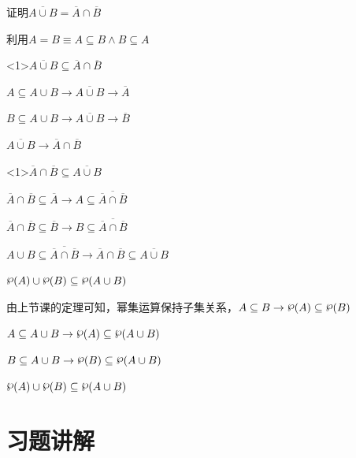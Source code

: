 \documentclass[xetex,10pt,aspectratio=43]{beamer}
\newcommand{\powerset}{\raisebox{.15\baselineskip}{\ensuremath{\wp}}}
\begin{document}
	\begin{frame}{证明$\overline{A\cup B}=\overline{A}\cap\overline{B}$}
	
	利用$A=B\equiv A\subseteq B\wedge B\subseteq A$
	
	\begin{block}{$\overline{A\cup B}\subseteq\overline{A}\cap\overline{B}$}

	$A\subseteq A\cup B\rightarrow\overline{A\cup B}\rightarrow\overline{A}$
	
	$B\subseteq A\cup B\rightarrow\overline{A\cup B}\rightarrow\overline{B}$
	
	$\overline{A\cup B}\rightarrow\overline{A}\cap\overline{B}$
		
	\end{block}

	\begin{block}{$\overline{A}\cap\overline{B}\subseteq\overline{A\cup B}$}
	
	$\overline{A}\cap\overline{B}\subseteq\overline{A}\rightarrow A\subseteq\overline{\overline{A}\cap\overline{B}}$
	
	$\overline{A}\cap\overline{B}\subseteq\overline{B}\rightarrow B\subseteq\overline{\overline{A}\cap\overline{B}}$
	
	$A\cup B\subseteq\overline{\overline{A}\cap\overline{B}}\rightarrow\overline{A}\cap\overline{B}\subseteq\overline{A\cup B}$
		
	\end{block}
	
	\end{frame}

	\begin{frame}{$\powerset(A)\cup\powerset(B)\subseteq\powerset(A\cup B)$}
	
	由上节课的定理可知，幂集运算保持子集关系，$A\subseteq B\rightarrow\powerset(A)\subseteq\powerset(B)$
	
	$A\subseteq A\cup B\rightarrow\powerset(A)\subseteq\powerset(A\cup B)$
	
	$B\subseteq A\cup B\rightarrow\powerset(B)\subseteq\powerset(A\cup B)$
	
	$\powerset(A)\cup\powerset(B)\subseteq\powerset(A\cup B)$
	
	\end{frame}

	\section{习题讲解}
	
\end{document}
